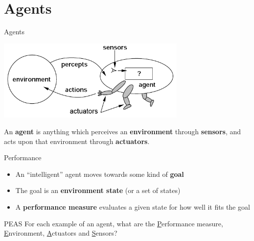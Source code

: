 \part{Agents}
\frame{\partpage}

\begin{frame}{Agents}
    \begin{center}
        \includegraphics[width=0.7\textwidth]{agent}

        \vspace{2ex}

        \pause An \textbf{agent} is anything which perceives an \textbf{environment} through \textbf{sensors},
            and acts upon that environment through \textbf{actuators}.
    \end{center}
\end{frame}

\begin{frame}{Performance}
    \begin{itemize}
        \pause\item An ``intelligent'' agent moves towards some kind of \textbf{goal}
        \pause\item The goal is an \textbf{environment state} (or a set of states)
        \pause\item A \textbf{performance measure} evaluates a given state for how well it fits the goal
    \end{itemize}
\end{frame}

\begin{frame}{PEAS}
    For each example of an agent, what are the \underline{P}erformance measure,
        \underline{E}nvironment, \underline{A}ctuators and \underline{S}ensors?
    
\end{frame}

